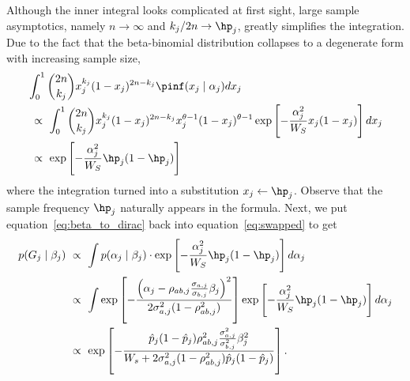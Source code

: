 Although the inner integral looks complicated at first sight, 
large sample asymptotics, namely $n \rightarrow \infty$ and $k_j/2n \rightarrow \hp_j$, greatly simplifies the integration.
Due to the fact that the beta-binomial distribution collapses to a degenerate form with increasing sample size,
\begin{align} \label{eq:beta_to_dirac}
    \begin{aligned}
        & \int_0^1 
        \binom{2n}{k_j} 
        x_j^{k_j}(1-x_j)^{2n-k_j}
        \pinf(x_j \mid \alpha_j) 
        dx_j \\
        & \ \propto \ \int_0^1   
        \binom{2n}{k_j} 
        x_j^{k_j}(1-x_j)^{2n-k_j}
        x_j^{\theta-1}(1-x_j)^{\theta-1}
        \exp\left[-\frac{\alpha_j^2}{W_S}x_j(1-x_j) \right]dx_j \\
        &\ \propto \ \exp\left[-\frac{\alpha_j^2}{W_S}\hp_j(1-\hp_j) \right]
    \end{aligned}
\end{align}
where the integration turned into a substitution $x_j \leftarrow \hp_j$.
Observe that the sample frequency $\hp_j$ naturally appears in the formula.
Next, we put equation~\ref{eq:beta_to_dirac} back into equation~\ref{eq:swapped} to get
\begin{align}
    \begin{aligned}
        p(G_j \mid \beta_j) 
        &\ \propto \
        \int p(\alpha_j \mid \beta_j) \cdot 
        \exp\left[-\frac{\alpha_j^2}{W_S}\hp_j(1-\hp_j) \right] d\alpha_j \\
        & \ \propto \ \int
        \exp \left[ -\frac{\left( \alpha_j - \rho_{ab,j} \frac{\sigma_{a,j}}{\sigma_{b,j}} \beta_j \right)^2}{2 \sigma_{a,j}^2 (1 - \rho_{ab,j}^2)} \right]
        \exp\left[-\frac{\alpha_j^2}{W_S}\hp_j(1-\hp_j) \right] d\alpha_j 
        \\
        & \ \propto \
        \exp \left[ -\frac{\hat{p}_j(1 - \hat{p}_j) \rho_{ab,j}^2 \frac{\sigma_{a,j}^2}{\sigma_{b,j}^2} \beta_j^2}{W_s + 2\sigma_{a,j}^2(1 - \rho_{ab,j}^2)\hat{p}_j(1 - \hat{p}_j)} \right].
    \end{aligned}
\end{align}


